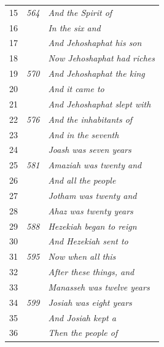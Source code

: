 \documentclass{article}
\newlength{\minipageheight}
\newlength{\minipagewidth}
\begin{document}
\begin{minipage}[r][\minipageheight][t]{\minipagewidth}
\begin{longtable}{ccl}
        15          & \textit{564} & \textit{And the Spirit of}           \\
        16          &              & \textit{In the six and}              \\
        17          &              & \textit{And Jehoshaphat his son}     \\
        18          &              & \textit{Now Jehoshaphat had riches}  \\
        19          & \textit{570} & \textit{And Jehoshaphat the king}    \\
        20          &              & \textit{And it came to}              \\
        21          &              & \textit{And Jehoshaphat slept with}  \\
        22          & \textit{576} & \textit{And the inhabitants of}      \\
        23          &              & \textit{And in the seventh}          \\
        24          &              & \textit{Joash was seven years}       \\
        25          & \textit{581} & \textit{Amaziah was twenty and}      \\
        26          &              & \textit{And all the people}          \\
        27          &              & \textit{Jotham was twenty and}       \\
        28          &              & \textit{Ahaz was twenty years}       \\
        29          & \textit{588} & \textit{Hezekiah began to reign}     \\
        30          &              & \textit{And Hezekiah sent to}        \\
        31          & \textit{595} & \textit{Now when all this}           \\
        32          &              & \textit{After these things, and}     \\
        33          &              & \textit{Manasseh was twelve years}   \\
        34          & \textit{599} & \textit{Josiah was eight years}      \\
        35          &              & \textit{And Josiah kept a}           \\
        36          &              & \textit{Then the people of}          \\
    \end{longtable}
\end{minipage}%
%
\end{document}
